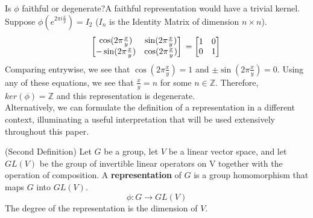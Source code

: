 	\noindent Is $\phi$ faithful or degenerate?A faithful representation would have a trivial kernel. Suppose $\phi(e^{2\pi i\frac{x}{y}}) = I_2$ ($I_n$ is the Identity Matrix of dimension $n\times n$). 
	\begin{equation}
			\begin{bmatrix}
				\cos(2\pi\frac{x}{y}) & \sin(2\pi\frac{x}{y}) \\
				-\sin(2\pi\frac{x}{y}) & \cos(2\pi\frac{x}{y})
			\end{bmatrix}\\
			= \begin{bmatrix}
				1 & 0 \\
				0 & 1 \\
			\end{bmatrix}\\
	\end{equation}
	\noindent Comparing entrywise, we see that $\cos(2\pi\frac{x}{y}) = 1$ and $\pm\sin(2\pi\frac{x}{y}) = 0$. Using any of these equations, we see that $\frac{x}{y}= n$ for some $n\in\mathbb{Z}$. Therefore, $ker(\phi)=\mathbb{Z}$ and this representation is degenerate.\\


Alternatively, we can formulate the definition of a representation in a different context, illuminating a useful interpretation that will be used extensively throughout this paper.

\begin{definition}
	(Second Definition) Let $G$ be a group, let $V$ be a linear vector space, and let $GL(V)$ be the group of invertible linear operators on V together with the operation of composition. A \textbf{representation} of $G$ is a group homomorphism that maps $G$ into $GL(V)$.
	$$\phi : G \rightarrow GL(V)$$
The degree of the representation is the dimension of $V$.
\end{definition}

